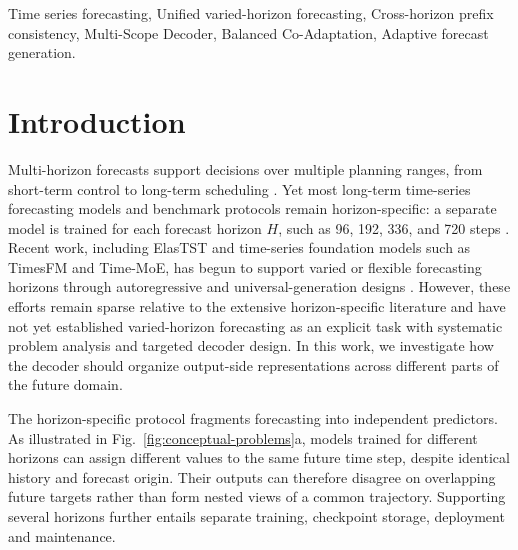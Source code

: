 \documentclass[final,3p,times]{elsarticle}
\begin{document}
\begin{frontmatter}
\begin{keyword}
Time series forecasting,
Unified varied-horizon forecasting,
Cross-horizon prefix consistency,
Multi-Scope Decoder,
Balanced Co-Adaptation,
Adaptive forecast generation.
\end{keyword}

\end{frontmatter}




\section{Introduction}
\label{sec:introduction}


Multi-horizon forecasts support decisions over multiple planning ranges, from short-term control to long-term scheduling \citep{zeng2023dlinear}. Yet most long-term time-series forecasting models and benchmark protocols remain horizon-specific: a separate model is trained for each forecast horizon $H$, such as 96, 192, 336, and 720 steps \citep{nie2023patchtst,liu2024itransformer}. Recent work, including ElasTST\citep{zhang2024elastst} and time-series foundation models such as TimesFM\citep{das2024timesfm} and Time-MoE\citep{shi2025timemoe}, has begun to support varied or flexible forecasting horizons through autoregressive and universal-generation designs \citep{liu2024timer,ansari2024chronos,woo2024moirai}. However, these efforts remain sparse relative to the extensive horizon-specific literature and have not yet established varied-horizon forecasting as an explicit task with systematic problem analysis and targeted decoder design. In this work, we investigate how the decoder should organize output-side representations across different parts of the future domain.

The horizon-specific protocol fragments forecasting into independent predictors. As illustrated in Fig.~\ref{fig:conceptual-problems}a, models trained for different horizons can assign different values to the same future time step, despite identical history and forecast origin. Their outputs can therefore disagree on overlapping future targets rather than form nested views of a common trajectory. Supporting several horizons further entails separate training, checkpoint storage, deployment and maintenance.
\end{document}
